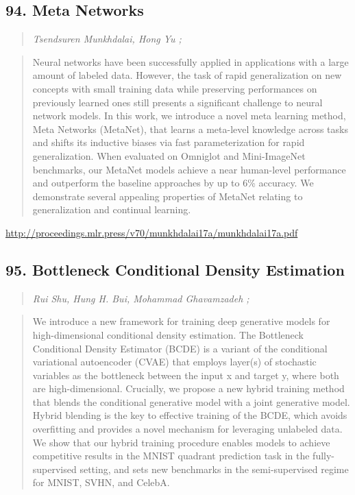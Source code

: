 \documentclass{article}
\begin{document}
\subsection{94. Meta Networks}

\begin{quote}
\footnotesize{\textit{Tsendsuren Munkhdalai, Hong Yu ;}}

\end{quote}

\begin{quote}
    Neural networks have been successfully applied in applications with a large amount of labeled data. However, the task of rapid generalization on new concepts with small training data while preserving performances on previously learned ones still presents a significant challenge to neural network models. In this work, we introduce a novel meta learning method, Meta Networks (MetaNet), that learns a meta-level knowledge across tasks and shifts its inductive biases via fast parameterization for rapid generalization. When evaluated on Omniglot and Mini-ImageNet benchmarks, our MetaNet models achieve a near human-level performance and outperform the baseline approaches by up to 6\% accuracy. We demonstrate several appealing properties of MetaNet relating to generalization and continual learning.  
\end{quote}

\href{http://proceedings.mlr.press/v70/munkhdalai17a/munkhdalai17a.pdf}{http://proceedings.mlr.press/v70/munkhdalai17a/munkhdalai17a.pdf}

\subsection{95. Bottleneck Conditional Density Estimation}

\begin{quote}
\footnotesize{\textit{Rui Shu, Hung H. Bui, Mohammad Ghavamzadeh ;}}

\end{quote}

\begin{quote}
    We introduce a new framework for training deep generative models for high-dimensional conditional density estimation. The Bottleneck Conditional Density Estimator (BCDE) is a variant of the conditional variational autoencoder (CVAE) that employs layer(s) of stochastic variables as the bottleneck between the input x and target y, where both are high-dimensional. Crucially, we propose a new hybrid training method that blends the conditional generative model with a joint generative model. Hybrid blending is the key to effective training of the BCDE, which avoids overfitting and provides a novel mechanism for leveraging unlabeled data. We show that our hybrid training procedure enables models to achieve competitive results in the MNIST quadrant prediction task in the fully-supervised setting, and sets new benchmarks in the semi-supervised regime for MNIST, SVHN, and CelebA.  
\end{quote}
\end{document}
